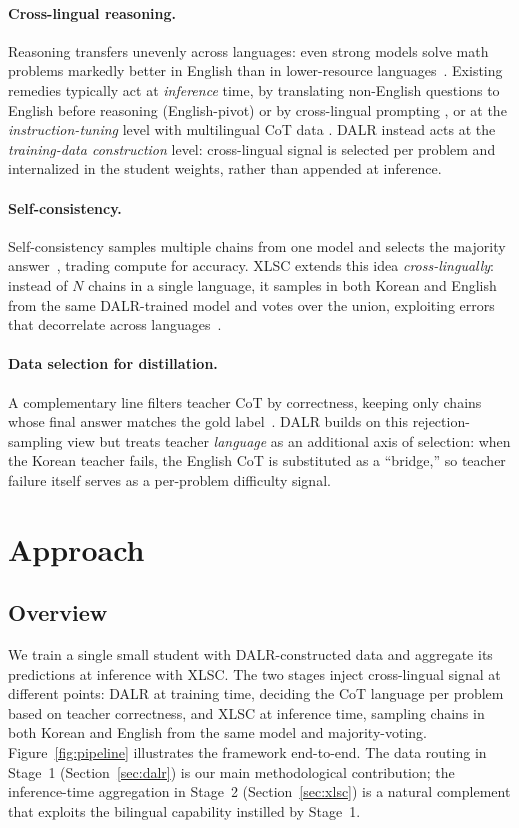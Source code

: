 \documentclass{article}
\begin{document}
\paragraph{Cross-lingual reasoning.}
Reasoning transfers unevenly across languages: even strong models
solve math problems markedly better in English than in lower-resource
languages~\citep{shi2023mgsm}. Existing remedies typically act at
\emph{inference} time, by translating non-English questions to
English before reasoning (English-pivot) or by cross-lingual prompting
\citep{qin2023crosslingual, chai2025xcot, huang2023languages}, or at
the \emph{instruction-tuning} level with multilingual CoT data
\citep{chen2024breaking}. DALR instead acts at the
\emph{training-data construction} level: cross-lingual signal is
selected per problem and internalized in the student weights, rather
than appended at inference.

\paragraph{Self-consistency.}
Self-consistency samples multiple chains from one model and selects
the majority answer~\citep{wang2022selfconsistency}, trading compute
for accuracy. XLSC extends this idea \emph{cross-lingually}: instead
of $N$ chains in a single language, it samples in both Korean and
English from the same DALR-trained model and votes over the union,
exploiting errors that decorrelate across
languages~\citep{huang2023languages}.

\paragraph{Data selection for distillation.}
A complementary line filters teacher CoT by correctness, keeping only
chains whose final answer matches the gold
label~\citep{zelikman2022star}. DALR builds on this rejection-sampling
view but treats teacher \emph{language} as an additional axis of
selection: when the Korean teacher fails, the English CoT is
substituted as a ``bridge,'' so teacher failure itself serves as a
per-problem difficulty signal.


\section{Approach}
\subsection{Overview}
We train a single small student with DALR-constructed data and
aggregate its predictions at inference with XLSC. The two stages
inject cross-lingual signal at different points: DALR at training
time, deciding the CoT language per problem based on teacher
correctness, and XLSC at inference time, sampling chains in both
Korean and English from the same model and majority-voting.
Figure~\ref{fig:pipeline} illustrates the framework end-to-end. The
data routing in Stage~1 (Section~\ref{sec:dalr}) is our main
methodological contribution; the inference-time aggregation in
Stage~2 (Section~\ref{sec:xlsc}) is a natural complement that
exploits the bilingual capability instilled by Stage~1.
\end{document}
